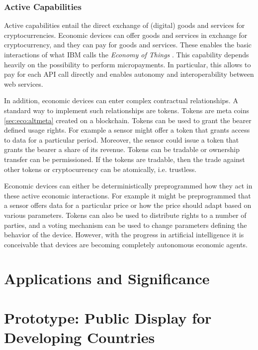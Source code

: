\subsubsection{Active Capabilities}
Active capabilities entail the direct exchange of (digital) goods and services for cryptocurrencies. Economic devices can offer goods and services in exchange for cryptocurrency, and they can pay for goods and services. These enables the basic interactions of what IBM calls the \emph{Economy of Things} \parencite{Pureswaran2015}. This capability depends heavily on the possibility to perform micropayments. In particular, this allows to pay for each \ac{API} call directly and enables autonomy and interoperability between web services. 

In addition, economic devices can enter complex contractual relationships. A standard way to implement such relationships are tokens. Tokens are meta coins \ref{sec:eco:altmeta} created on a blockchain. Tokens can be used to grant the bearer defined usage rights. For example a sensor might offer a token that grants access to data for a particular period. Moreover, the sensor could issue a token that grants the bearer a share of its revenue. Tokens can be tradable or ownership transfer can be permissioned. If the tokens are tradable, then the trade against other tokens or cryptocurrency can be atomically, i.e. trustless.

Economic devices can either be deterministically preprogrammed how they act in these active economic interactions. For example it might be preprogrammed that a sensor offers data for a particular price or how the price should adapt based on various parameters. Tokens can also be used to distribute rights to a number of parties, and a voting mechanism can be used to change parameters defining the behavior of the device. However, with the progress in artificial intelligence it is conceivable that devices are becoming completely autonomous economic agents. 

\section{Applications and Significance} 





\section{Prototype: Public Display for Developing Countries}
\label{sec:caseDisplay}

